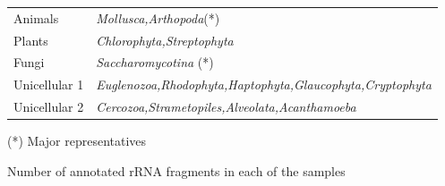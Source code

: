 \documentclass[a4paper]{article}
\begin{document}
\vskip 5pt

\begin{tabular}{ll}
\hline
Animals&\textit{Mollusca,Arthopoda}(*)\\
Plants&\textit{Chlorophyta,Streptophyta}\\
Fungi&\textit{Saccharomycotina} (*)\\
Unicellular 1&\textit{Euglenozoa,Rhodophyta,Haptophyta,Glaucophyta,Cryptophyta}\\
Unicellular 2&\textit{Cercozoa,Strametopiles,Alveolata,Acanthamoeba}\\
\hline
\end{tabular}

{\small(*) Major representatives}

\vskip 5pt

\newpage
Number of annotated rRNA fragments in each of the samples

\vskip 5pt
\end{document}
